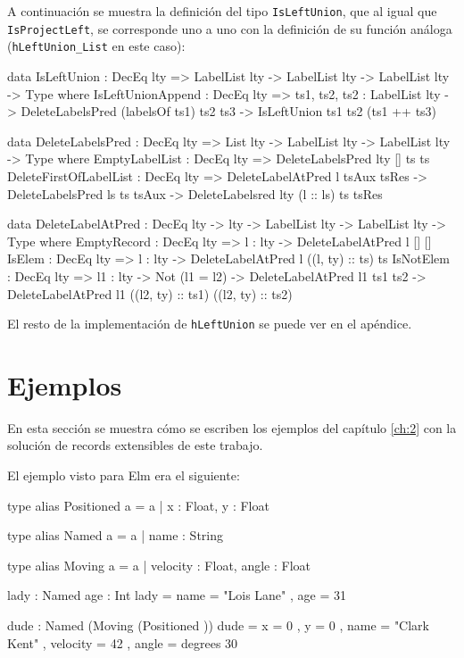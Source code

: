 A continuación se muestra la definición del tipo \texttt{IsLeftUnion}, que al igual que \texttt{IsProjectLeft}, se corresponde uno a uno con la definición de su función análoga (\texttt{hLeftUnion\_List} en este caso):

\begin{code}
data IsLeftUnion : DecEq lty => LabelList lty -> LabelList lty ->
  LabelList lty -> Type where
  IsLeftUnionAppend : DecEq lty =>
    {ts1, ts2, ts2 : LabelList lty} ->
    DeleteLabelsPred (labelsOf ts1) ts2 ts3 ->
    IsLeftUnion ts1 ts2 (ts1 ++ ts3)

data DeleteLabelsPred : DecEq lty => List lty -> LabelList lty ->
  LabelList lty -> Type where
  EmptyLabelList : DecEq lty =>
    DeleteLabelsPred {lty} [] ts ts
  DeleteFirstOfLabelList : DecEq lty =>
    DeleteLabelAtPred l tsAux tsRes ->
    DeleteLabelsPred ls ts tsAux ->
    DeleteLabelsred {lty} (l :: ls) ts tsRes

data DeleteLabelAtPred : DecEq lty -> lty -> LabelList lty ->
  LabelList lty -> Type where
  EmptyRecord : DecEq lty => {l : lty} ->
    DeleteLabelAtPred l [] []
  IsElem : DecEq lty => {l : lty} ->
    DeleteLabelAtPred l ((l, ty) :: ts) ts
  IsNotElem : DecEq lty => {l1 : lty} -> Not (l1 = l2) ->
    DeleteLabelAtPred l1 ts1 ts2 ->
    DeleteLabelAtPred l1 ((l2, ty) :: ts1) ((l2, ty) :: ts2)
\end{code}

El resto de la implementación de \texttt{hLeftUnion} se puede ver en el apéndice.

\section{Ejemplos}

En esta sección se muestra cómo se escriben los ejemplos del capítulo \ref{ch:2} con la solución de records extensibles de este trabajo.

El ejemplo visto para Elm era el siguiente:

\begin{code}
type alias Positioned a =
  { a | x : Float, y : Float }

type alias Named a =
  { a | name : String }

type alias Moving a =
  { a | velocity : Float, angle : Float }

lady : Named { age : Int }
lady =
  { name = "Lois Lane"
  , age = 31
  }

dude : Named (Moving (Positioned {}))
dude =
  { x = 0
  , y = 0
  , name = "Clark Kent"
  , velocity = 42
  , angle = degrees 30
  }
\end{code}

